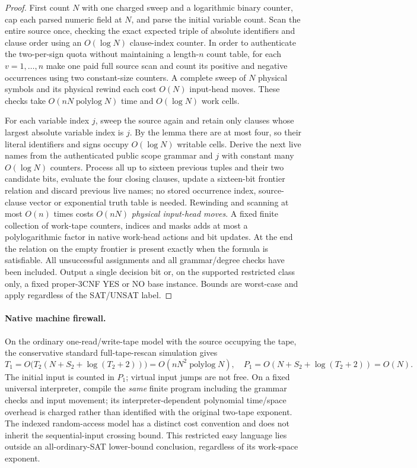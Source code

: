 \documentclass[11pt]{article}
\begin{document}
\begin{proof}
First count $N$ with one charged sweep and a logarithmic binary counter, cap each parsed numeric field at $N$, and parse the initial variable count. Scan the entire source once, checking the exact expected triple of absolute identifiers and clause order using an $O(\log N)$ clause-index counter. In order to authenticate the two-per-sign quota without maintaining a length-$n$ count table, for each $v=1,\dots,n$ make one paid full source scan and count its positive and negative occurrences using two constant-size counters. A complete sweep of $N$ physical symbols and its physical rewind each cost $O(N)$ input-head moves. These checks take $O(nN\operatorname{polylog}N)$ time and $O(\log N)$ work cells.

For each variable index $j$, sweep the source again and retain only clauses whose largest absolute variable index is $j$. By the lemma there are at most four, so their literal identifiers and signs occupy $O(\log N)$ writable cells. Derive the next live names from the authenticated public scope grammar and $j$ with constant many $O(\log N)$ counters. Process all up to sixteen previous tuples and their two candidate bits, evaluate the four closing clauses, update a sixteen-bit frontier relation and discard previous live names; no stored occurrence index, source-clause vector or exponential truth table is needed. Rewinding and scanning at most $O(n)$ times costs $O(nN)$ \emph{physical input-head moves}. A fixed finite collection of work-tape counters, indices and masks adds at most a polylogarithmic factor in native work-head actions and bit updates. At the end the relation on the empty frontier is present exactly when the formula is satisfiable. All unsuccessful assignments and all grammar/degree checks have been included. Output a single decision bit or, on the supported restricted class only, a fixed proper-3CNF YES or NO base instance. Bounds are worst-case and apply regardless of the SAT/UNSAT label.
\end{proof}
\paragraph{Native machine firewall.} On the ordinary one-read/write-tape model with the source occupying the tape, the conservative standard full-tape-rescan simulation gives
\[
 T_1=O\bigl(T_2(N+S_2+\log(T_2+2))\bigr)
 =O(nN^2\operatorname{polylog}N),\quad
 P_1=O(N+S_2+\log(T_2+2))=O(N).
\]
The initial input is counted in $P_1$; virtual input jumps are not free. On a fixed universal interpreter, compile the \emph{same} finite program including the grammar checks and input movement; its interpreter-dependent polynomial time/space overhead is charged rather than identified with the original two-tape exponent. The indexed random-access model has a distinct cost convention and does not inherit the sequential-input crossing bound. This restricted easy language lies outside an all-ordinary-SAT lower-bound conclusion, regardless of its work-space exponent.
\end{document}
